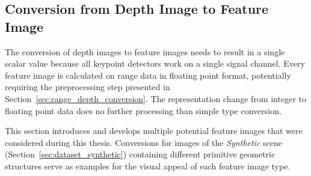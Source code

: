\subsection{Conversion from Depth Image to Feature Image}\label{sec:feature_images}

The conversion of depth images to feature images needs to result in a single scalar value because all keypoint detectors work on a single signal channel.
Every feature image is calculated on range data in floating point format, potentially requiring the preprocessing step presented in Section~\ref{sec:range_depth_conversion}.
The representation change from integer to floating point data does no further processing than simple type conversion.

This section introduces and develops multiple potential feature images that were considered during this thesis.
Conversions for images of the \emph{Synthetic} scene (Section~\ref{sec:dataset_synthetic}) containing different primitive geometric structures serve as examples for the visual appeal of each feature image type.






